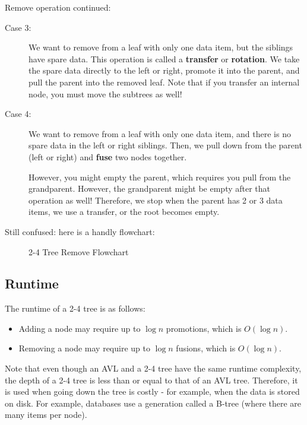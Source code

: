 \documentclass[a4paper]{article}
\begin{document}

Remove operation continued:

\begin{description}
	\item[Case 3:] We want to remove from a leaf with only one data item, but the siblings have spare data. This operation is called a \textbf{transfer} or \textbf{rotation}. We take the spare data directly to the left or right, promote it into the parent, and pull the parent into the removed leaf. Note that if you transfer an internal node, you must move the subtrees as well!
	\item[Case 4:] We want to remove from a leaf with only one data item, and there is no spare data in the left or right siblings. Then, we pull down from the parent (left or right) and \textbf{fuse} two nodes together. \par
		However, you might empty the parent, which requires you pull from the grandparent. However, the grandparent might be empty after that operation as well! Therefore, we stop when the parent has 2 or 3 data items, we use a transfer, or the root becomes empty.
\end{description}

Still confused: here is a handly flowchart:
\begin{figure}[ht]
    \centering
    \caption{2-4 Tree Remove Flowchart}
    \label{fig:2-4-tree-remove-flowchart}
\end{figure}

\subsection{Runtime}
The runtime of a 2-4 tree is as follows:
\begin{itemize}
	\item Adding a node may require up to \( \log n \) promotions, which is \( O(\log n) \).
	\item Removing a node may require up to \( \log n \) fusions, which is \( O(\log n) \).
\end{itemize}

\begin{note}
	Note that even though an AVL and a 2-4 tree have the same runtime complexity, the depth of a 2-4 tree is less than or equal to that of an AVL tree. Therefore, it is used when going down the tree is costly - for example, when the data is stored on disk. For example, databases use a generation called a B-tree (where there are many items per node).
\end{note}
\end{document}

